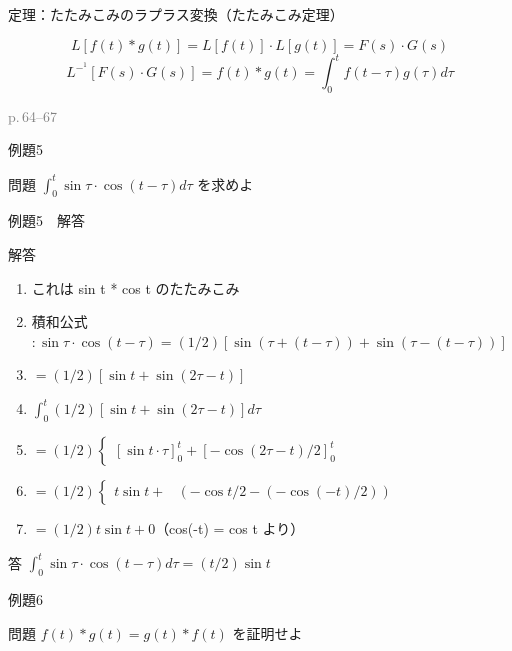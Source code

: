 \documentclass[aspectratio=43,professionalfonts,handout]{beamer}
\begin{document}
\begin{frame}{定理：たたみこみのラプラス変換（たたみこみ定理）}
  \begin{block}{}
  \[
    L[f(t) * g(t)] = L[f(t)] \cdot L[g(t)] = F(s) \cdot G(s)
  \]
  \[
    L^{-}^{1}[F(s) \cdot G(s)] = f(t) * g(t) = \int_{0}^t f(t-\tau)g(\tau) d\tau
  \]
  \end{block}
  \vfill\hfill{\scriptsize \textcolor{gray}{p.\,64--67}}
\end{frame}

\begin{frame}{例題5}
  \begin{exampleblock}{問題}
    $\int_{0}^t \sin \tau \cdot \cos(t-\tau) d\tau$ を求めよ\\[2pt]
  \end{exampleblock}
\end{frame}

\begin{frame}{例題5　解答}
  \begin{exampleblock}{解答}
  \begin{enumerate}[1.]
    \item[] これは sin t * cos t のたたみこみ
    \item[] 積和公式 $: \sin \tau\cdot \cos(t-\tau) = (1/2)[\sin(\tau+(t-\tau)) + \sin(\tau-(t-\tau))]$
    \item[] $= (1/2)[\sin t + \sin(2\tau-t)]$
    \item[] $\int_{0}^t (1/2)[\sin t + \sin(2\tau-t)]d\tau$
    \item[] $= (1/2)\begin{cases} [\sin t \cdot \tau]_{0}^t + [-\cos(2\tau-t)/2]_{0}^t \end{cases}$
    \item[] $= (1/2)\begin{cases} t \sin t + & (-\cos t/2 - (-\cos(-t)/2)) \end{cases}$
    \item[] $= (1/2){t \sin t + 0}$（cos(-t) = cos t より）
  \end{enumerate}
  \end{exampleblock}
  \begin{alertblock}{答}
    $\int_{0}^t \sin \tau \cdot \cos(t-\tau) d\tau = (t/2) \sin t$
  \end{alertblock}
\end{frame}

\begin{frame}{例題6}
  \begin{exampleblock}{問題}
    $f(t) * g(t) = g(t) * f(t)$ を証明せよ\\[2pt]
  \end{exampleblock}
\end{frame}
\end{document}
